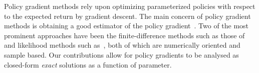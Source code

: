 Policy gradient methods rely upon optimizing parameterized policies with respect to the expected return by gradient descent. The main concern of policy gradient methods is obtaining a good estimator of the policy gradient~\parencite{Peters_IRS_2006}. Two of the most prominent approaches have been the finite-difference methods such as those of~\parencite{Ng_UAI_2000} and likelihood methods such as~\parencite{Baxter_ISCAS_2000}, both of which are numerically oriented and sample based. Our contributions allow for policy gradients to be analysed as closed-form \textit{exact} solutions as a function of parameter.

